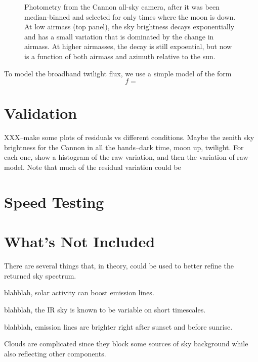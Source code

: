 \documentclass{emulateapj}  %
\begin{document}
\begin{figure*}
  \caption{Photometry from the Cannon all-sky camera, after it was been median-binned and selected for only times where the moon is down.  At low airmass (top panel), the sky brightness decays exponentially and has a small variation that is dominated by the change in airmass.  At higher airmasses, the decay is still expoential, but now is a function of both airmass and azimuth relative to the sun.}
\end{figure*}

To model the broadband twilight flux, we use a simple model of the form
\begin{equation}
  f = 
\end{equation}



\section{Validation}

XXX--make some plots of residuals vs different conditions.  Maybe the zenith sky brightness for the Cannon in all the bands--dark time, moon up, twilight.  For each one, show a histogram of the raw variation, and then the variation of raw-model.  Note that much of the residual variation could be 

\section{Speed Testing}



\section{What's Not Included}

There are several things that, in theory, could be used to better refine the returned sky spectrum.

blahblah, solar activity can boost emission lines.

blahblah, the IR sky is known to be variable on short timescales.

blahblah, emission lines are brighter right after sunset and before sunrise.

Clouds are complicated since they block some sources of sky background while also reflecting other components.  



\end{document}
